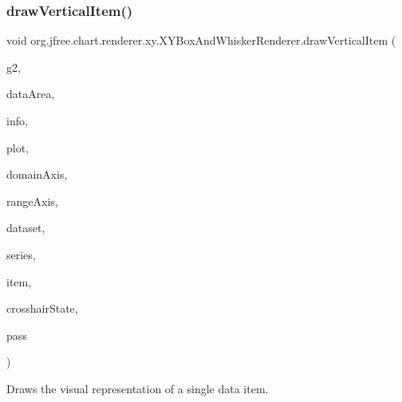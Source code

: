 \subsubsection{\texorpdfstring{draw\+Vertical\+Item()}{drawVerticalItem()}}
{\footnotesize\ttfamily void org.\+jfree.\+chart.\+renderer.\+xy.\+X\+Y\+Box\+And\+Whisker\+Renderer.\+draw\+Vertical\+Item (\begin{DoxyParamCaption}\item[{Graphics2D}]{g2,  }\item[{Rectangle2D}]{data\+Area,  }\item[{\mbox{\hyperlink{classorg_1_1jfree_1_1chart_1_1plot_1_1_plot_rendering_info}{Plot\+Rendering\+Info}}}]{info,  }\item[{\mbox{\hyperlink{classorg_1_1jfree_1_1chart_1_1plot_1_1_x_y_plot}{X\+Y\+Plot}}}]{plot,  }\item[{\mbox{\hyperlink{classorg_1_1jfree_1_1chart_1_1axis_1_1_value_axis}{Value\+Axis}}}]{domain\+Axis,  }\item[{\mbox{\hyperlink{classorg_1_1jfree_1_1chart_1_1axis_1_1_value_axis}{Value\+Axis}}}]{range\+Axis,  }\item[{\mbox{\hyperlink{interfaceorg_1_1jfree_1_1data_1_1xy_1_1_x_y_dataset}{X\+Y\+Dataset}}}]{dataset,  }\item[{int}]{series,  }\item[{int}]{item,  }\item[{\mbox{\hyperlink{classorg_1_1jfree_1_1chart_1_1plot_1_1_crosshair_state}{Crosshair\+State}}}]{crosshair\+State,  }\item[{int}]{pass }\end{DoxyParamCaption})}

Draws the visual representation of a single data item.



